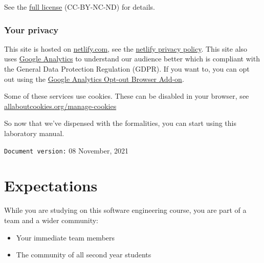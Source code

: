 \documentclass[
]{book}
\providecommand{\tightlist}{%
  \setlength{\itemsep}{0pt}\setlength{\parskip}{0pt}}
\begin{document}
See the \href{https://creativecommons.org/licenses/by-nc-nd/3.0/}{full license} (CC-BY-NC-ND) for details.

\hypertarget{privacy}{%
\subsection{Your privacy}\label{privacy}}

This site is hosted on \href{https://www.netlify.com/}{netlify.com}, see the \href{https://www.netlify.com/privacy/}{netlify privacy policy}. This site also uses \href{https://en.wikipedia.org/wiki/Google_Analytics}{Google Analytics} to understand our audience better which is compliant with the General Data Protection Regulation (GDPR). If you want to, you can opt out using the \href{https://tools.google.com/dlpage/gaoptout/}{Google Analytics Opt-out Browser Add-on}.

Some of these services use cookies. These can be disabled in your browser, see \href{https://www.allaboutcookies.org/manage-cookies/}{allaboutcookies.org/manage-cookies}

So now that we've dispensed with the formalities, you can start using this laboratory manual.





































\texttt{Document\ version:} 08 November, 2021

\hypertarget{expectations}{%
\chapter*{Expectations}\label{expectations}}

While you are studying on this software engineering course, you are part of a team and a wider community:

\begin{itemize}
\tightlist
\item
  Your immediate team members
\item
  The community of all second year students
\end{itemize}
\end{document}
